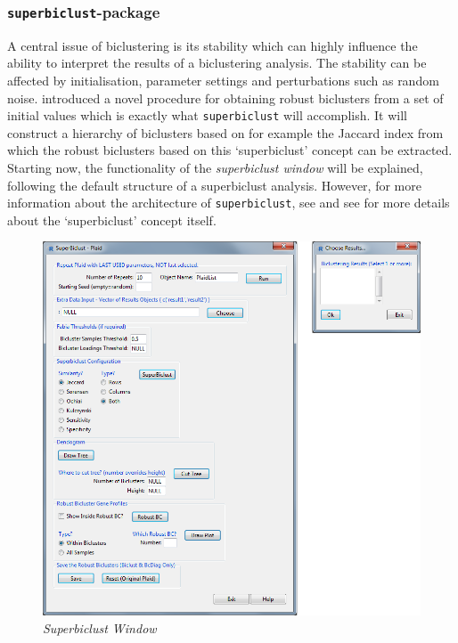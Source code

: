 \documentclass[a4paper]{article}\usepackage[]{graphicx}\usepackage[]{color}
\begin{document}
\subsubsection{\texttt{superbiclust}-package}
A central issue of biclustering is its stability which can highly influence the
ability to interpret the results of a biclustering analysis. The stability can
be affected by initialisation, parameter settings and perturbations such as
random noise. \citet{Shi2010} introduced a novel procedure for obtaining
robust biclusters from a set of initial values which is exactly what
\verb|superbiclust| will accomplish. It will construct a hierarchy of
biclusters based on for example the Jaccard index from which the robust
biclusters based on this `superbiclust' concept can be extracted.\\
\noindent Starting now, the functionality of the {\it superbiclust window} will
be explained, following the default structure of a superbiclust analysis.
However, for more information about the architecture of \verb|superbiclust|, see
\citet{Khamiakova2013} and see \citet{Shi2010} for more details
about the `superbiclust' concept itself.
\begin{figure}[H]
\centering
\includegraphics[scale=0.5]{figures/superbiclust.png}
\caption{{\it Superbiclust Window}\label{superbiclust}}
\end{figure}
\end{document}
